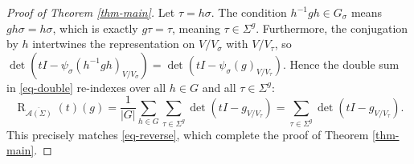 \documentclass[10pt,a4paper]{amsart}
\begin{document}
\begin{proof}[Proof of Theorem \ref{thm-main}]
Let $\tau = h\sigma$. The condition $h^{-1}gh \in G_\sigma$ means $gh\sigma = h\sigma$, which is exactly $g\tau = \tau$, meaning $\tau \in \Sigma^g$. Furthermore, the conjugation by $h$ intertwines the representation on $V/V_\sigma$ with $V/V_\tau$, so $\operatorname{det}(tI - \psi_\sigma(h^{-1}gh)_{V/V_\sigma}) = \operatorname{det}(tI - \psi_\sigma(g)_{V/V_\tau})$. Hence the double sum in \eqref{eq-double} re-indexes over all $h \in G$ and all $\tau \in \Sigma^g$:
$$\operatorname{R}_{\overline{\mathcal{A}(\Sigma)}}(t)(g) = \frac{1}{|G|} \sum_{h \in G} \sum_{\tau \in \Sigma^g} \operatorname{det}(tI - g_{V/V_\tau}) = \sum_{\tau \in \Sigma^g} \operatorname{det}(tI - g_{V/V_\tau}).$$
This precisely matches \eqref{eq-reverse}, which complete the proof of Theorem \ref{thm-main}.
\end{proof}
\end{document}
